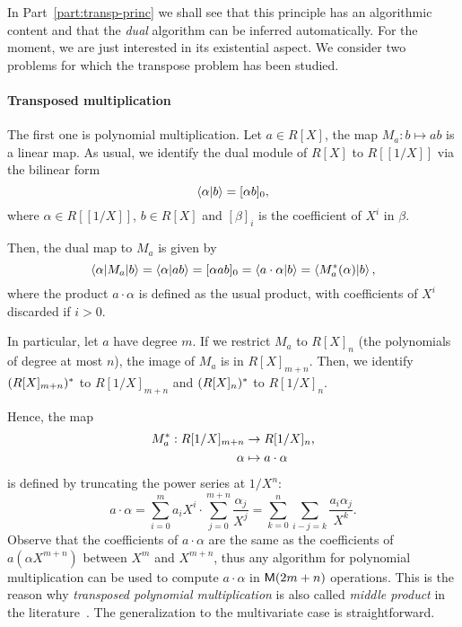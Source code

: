 In Part~\ref{part:transp-princ} we shall see that this principle has
an algorithmic content and that the \emph{dual} algorithm can be
inferred automatically. For the moment, we are just interested in its
existential aspect. We consider two problems for which the transpose
problem has been studied.

\paragraph{Transposed multiplication}
\label{sec:transp-mult}
The first one is polynomial
multiplication. Let $a\in R[X]$, the map $M_a:b\mapsto ab$ is a linear
map. As usual, we identify the dual module of $R[X]$ to $R[[1/X]]$ via
the bilinear form
\begin{equation}
  \label{eq:276}
  \left\langle \alpha \middle| b \right\rangle = [\alpha b]_0
  \text{,}
\end{equation}
where $\alpha\in R[[1/X]]$, $b\in R[X]$ and
$[\beta]_i$ is the coefficient of
$X^i$ in $\beta$.

Then, the dual map to $M_a$ is given by
\begin{equation}
  \label{eq:229}
  \left\langle \alpha \middle| M_a \middle| b \right\rangle = \left\langle \alpha \middle| ab \right\rangle = [\alpha ab]_0 =
  \left\langle a\cdot\alpha \middle| b \right\rangle = \left\langle M_a^\ast(\alpha) \middle| b \right\rangle
  \text{,}
\end{equation}
where the product $a\cdot\alpha$ is defined as the usual product,
with coefficients of $X^i$ discarded if $i>0$.

In particular, let $a$ have degree $m$. If we restrict $M_a$ to
$R[X]_n$ (the polynomials of degree at most $n$), the image of $M_a$
is in $R[X]_{m+n}$. Then, we identify $(R[X]_{m+n})^\ast$ to
$R[1/X]_{m+n}$ and $(R[X]_n)^\ast$ to $R[1/X]_n$. 

Hence, the map 
\begin{equation}
  \label{eq:231}
  \begin{aligned}
    M_a^\ast:R[1/X]_{m+n}&\rightarrow R[1/X]_n\text{,}\\
    \alpha&\mapsto a\cdot\alpha  
  \end{aligned}
\end{equation}
is defined by truncating the power series at $1/X^n$:
\begin{equation}
  \label{eq:230}
  a\cdot\alpha = \sum_{i=0}^ma_iX^i \cdot \sum_{j=0}^{m+n}\frac{\alpha_j}{X^j} =
  \sum_{k=0}^{n}\sum_{i-j=k}\frac{a_i\alpha_j}{X^k}
  \text{.}
\end{equation}
Observe that the coefficients of $a\cdot\alpha$ are the same as the
coefficients of $a(\alpha X^{m+n})$ between $X^{m}$ and $X^{m+n}$,
thus any algorithm for polynomial multiplication can be used to
compute $a\cdot\alpha$ in $\mathsf{M}(2m+n)$ operations. This is the reason
why \emph{transposed polynomial multiplication} is also called
\emph{middle product} in the
literature~\cite{bostan+lecerf+schost:tellegen,hanrot+quercia+zimmermann}.
The generalization to the multivariate case is straightforward.

